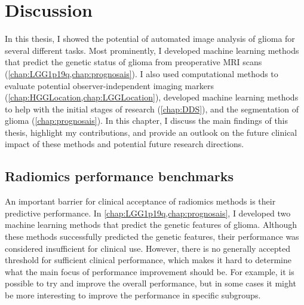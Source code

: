 
\chapter{Discussion}\label{chap:discussion}

In this thesis, I showed the potential of automated image analysis of glioma for several different tasks.
Most prominently, I developed machine learning methods that predict the genetic status of glioma from preoperative \gls{MRI} scans (\cref{chap:LGG1p19q,chap:prognosais}).
I also used computational methods to evaluate potential observer-independent imaging markers (\cref{chap:HGGLocation,chap:LGGLocation}), developed machine learning methods to help with the initial stages of research (\cref{chap:DDS}), and the segmentation of glioma (\cref{chap:prognosais}).
In this chapter, I discuss the main findings of this thesis, highlight my contributions, and provide an outlook on the future clinical impact of these methods and potential future research directions.

\section{Radiomics performance benchmarks}

An important barrier for clinical acceptance of radiomics methods is their predictive performance.
In \cref{chap:LGG1p19q,chap:prognosais}, I developed two machine learning methods that predict the genetic features of glioma.
Although these methods successfully predicted the genetic features, their performance was considered insufficient for clinical use.
However, there is no generally accepted threshold for sufficient clinical performance, which makes it hard to determine what the main focus of performance improvement should be.
For example, it is possible to try and improve the overall performance, but in some cases it might be more interesting to improve the performance in specific subgroups.

